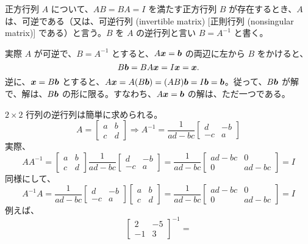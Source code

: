 \begin{definition}
正方行列 $A$ について、$AB = BA = I$ を満たす正方行列 $B$ が存在するとき、$A$ は、{\gt 可逆}である（又は、可逆行列 (invertible matrix)  [{\gt 正則行列} (nonsingular matrix)] である）と言う。$B$ を $A$ の逆行列と言い $B = A^{-1}$ と書く。
\end{definition}

実際 $A$ が可逆で、$B = A^{-1}$ とすると、$A\mbox{\boldmath $x$} = \mbox{\boldmath $b$}$ の両辺に左から $B$ をかけると、
$$B\mbox{\boldmath $b$} = BA\mbox{\boldmath $x$} = I\mbox{\boldmath $x$} = \mbox{\boldmath $x$}.$$
逆に、$\mbox{\boldmath $x$} = B\mbox{\boldmath $b$}$ とすると、$A\mbox{\boldmath $x$} = A(B\mbox{\boldmath $b$}) = (AB)\mbox{\boldmath $b$} = I\mbox{\boldmath $b$} = \mbox{\boldmath $b$}$。従って、$B\mbox{\boldmath $b$}$ が解で、解は、$B\mbox{\boldmath $b$}$ の形に限る。すなわち、$A\mbox{\boldmath $x$} = \mbox{\boldmath $b$}$ の解は、ただ一つである。

\begin{eg}
$2\times 2$ 行列の逆行列は簡単に求められる。
$$A = \left[\begin{array}{cc}a & b\\ c & d \end{array}\right] \Rightarrow
A^{-1} = \frac1{ad-bc}\left[\begin{array}{cc}d & -b\\ -c & a \end{array}\right]$$
実際、
$$AA^{-1} = \left[\begin{array}{cc}a & b\\ c & d \end{array}\right]
\frac1{ad-bc}\left[\begin{array}{cc}d & -b\\ -c & a \end{array}\right] = 
\frac1{ad-bc}\left[\begin{array}{cc}ad - bc & 0\\ 0 & ad - bc \end{array}\right] = I$$
同様にして、
$$A^{-1}A = \frac1{ad-bc}\left[\begin{array}{cc}d & -b\\ -c & a \end{array}\right]
\left[\begin{array}{cc}a & b\\ c & d \end{array}\right] = 
\frac1{ad-bc}\left[\begin{array}{cc}ad - bc & 0\\ 0 & ad - bc \end{array}\right] = I$$
例えば、
$$\left[\begin{array}{cc}2 & -5\\ -1 & 3 \end{array}\right]^{-1} = 
$$
\end{eg}
